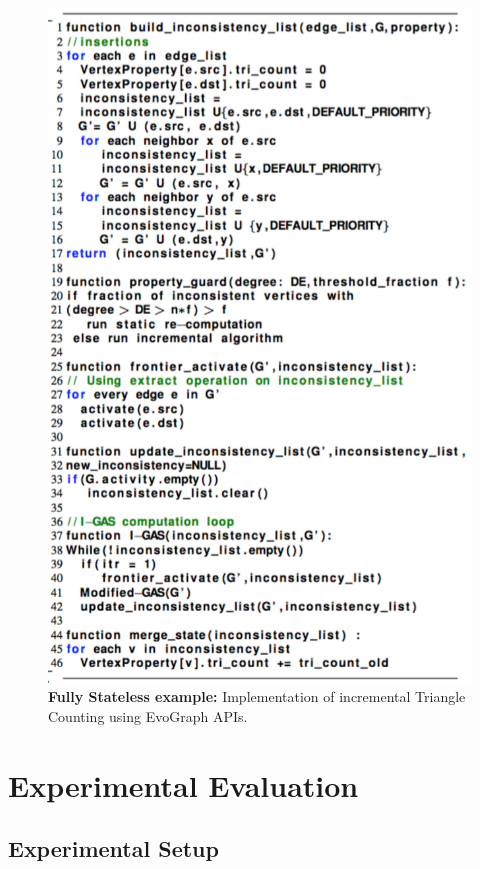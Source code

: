 \begin{figure}[!t]
\centering
\includegraphics [width=\textwidth,height=0.85\textheight,keepaspectratio]{figures/TC-inc.pdf}
\caption{\textbf{Fully Stateless example: }Implementation of incremental Triangle Counting using EvoGraph APIs. }
\label{fig:TC-inc}
\end{figure}

\section{Experimental Evaluation}
\subsection{Experimental Setup}

